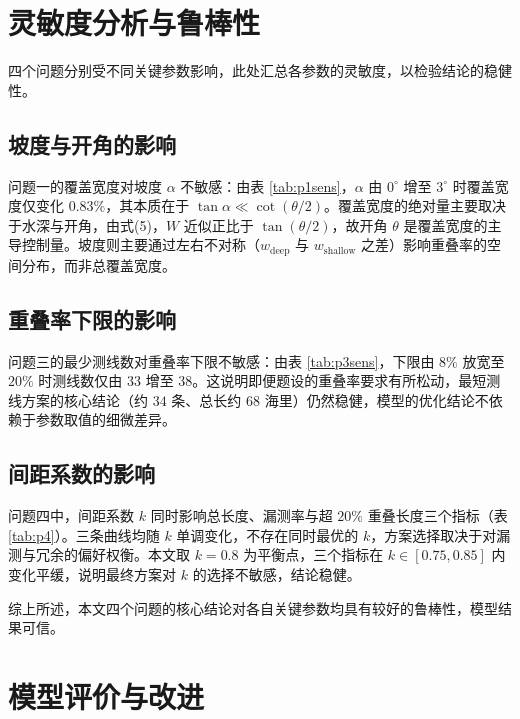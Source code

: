 \documentclass[12pt]{ctexart}
\begin{document}
\section{灵敏度分析与鲁棒性}

四个问题分别受不同关键参数影响，此处汇总各参数的灵敏度，以检验结论的稳健性。

\subsection{坡度与开角的影响}

问题一的覆盖宽度对坡度 $\alpha$ 不敏感：由表 \ref{tab:p1sens}，$\alpha$ 由 $0^\circ$ 增至 $3^\circ$ 时覆盖宽度仅变化 $0.83\%$，其本质在于 $\tan\alpha\ll\cot(\theta/2)$。覆盖宽度的绝对量主要取决于水深与开角，由式(5)，$W$ 近似正比于 $\tan(\theta/2)$，故开角 $\theta$ 是覆盖宽度的主导控制量。坡度则主要通过左右不对称（$w_{\mathrm{deep}}$ 与 $w_{\mathrm{shallow}}$ 之差）影响重叠率的空间分布，而非总覆盖宽度。

\subsection{重叠率下限的影响}

问题三的最少测线数对重叠率下限不敏感：由表 \ref{tab:p3sens}，下限由 $8\%$ 放宽至 $20\%$ 时测线数仅由 $33$ 增至 $38$。这说明即便题设的重叠率要求有所松动，最短测线方案的核心结论（约 $34$ 条、总长约 $68$ 海里）仍然稳健，模型的优化结论不依赖于参数取值的细微差异。

\subsection{间距系数的影响}

问题四中，间距系数 $k$ 同时影响总长度、漏测率与超 $20\%$ 重叠长度三个指标（表 \ref{tab:p4}）。三条曲线均随 $k$ 单调变化，不存在同时最优的 $k$，方案选择取决于对漏测与冗余的偏好权衡。本文取 $k=0.8$ 为平衡点，三个指标在 $k\in[0.75,0.85]$ 内变化平缓，说明最终方案对 $k$ 的选择不敏感，结论稳健。

综上所述，本文四个问题的核心结论对各自关键参数均具有较好的鲁棒性，模型结果可信。

\section{模型评价与改进}
\end{document}
